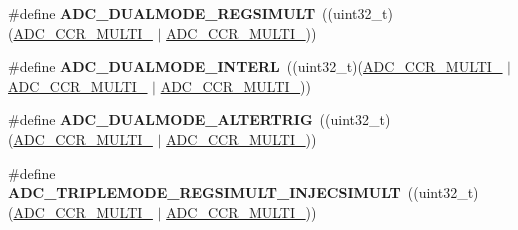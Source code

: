 \begin{DoxyCompactItemize}
\mbox{\label{group___a_d_c_ex___common__mode_ga5318d363b48a4244335cdafaed0d179c}} 
\#define {\bfseries A\+D\+C\+\_\+\+D\+U\+A\+L\+M\+O\+D\+E\+\_\+\+R\+E\+G\+S\+I\+M\+U\+LT}~((uint32\+\_\+t)(\mbox{\hyperlink{group___peripheral___registers___bits___definition_gae6a5be6cff1227431b8d54dffcc1ce88}{A\+D\+C\+\_\+\+C\+C\+R\+\_\+\+M\+U\+L\+T\+I\+\_}} $\vert$ \mbox{\hyperlink{group___peripheral___registers___bits___definition_ga8781dec7f076b475b85f8470aee94d06}{A\+D\+C\+\_\+\+C\+C\+R\+\_\+\+M\+U\+L\+T\+I\+\_}}))
\item 
\mbox{\label{group___a_d_c_ex___common__mode_ga29697d148e4ed75c3d2adaef0f3e1385}} 
\#define {\bfseries A\+D\+C\+\_\+\+D\+U\+A\+L\+M\+O\+D\+E\+\_\+\+I\+N\+T\+E\+RL}~((uint32\+\_\+t)(\mbox{\hyperlink{group___peripheral___registers___bits___definition_gae6a5be6cff1227431b8d54dffcc1ce88}{A\+D\+C\+\_\+\+C\+C\+R\+\_\+\+M\+U\+L\+T\+I\+\_}} $\vert$ \mbox{\hyperlink{group___peripheral___registers___bits___definition_ga8781dec7f076b475b85f8470aee94d06}{A\+D\+C\+\_\+\+C\+C\+R\+\_\+\+M\+U\+L\+T\+I\+\_}} $\vert$ \mbox{\hyperlink{group___peripheral___registers___bits___definition_gae4e7104ce01e3a79b8f6138d87dc3684}{A\+D\+C\+\_\+\+C\+C\+R\+\_\+\+M\+U\+L\+T\+I\+\_}}))
\item 
\mbox{\label{group___a_d_c_ex___common__mode_ga45e63dd5e2f36e62fa1b2cb9eff891ed}} 
\#define {\bfseries A\+D\+C\+\_\+\+D\+U\+A\+L\+M\+O\+D\+E\+\_\+\+A\+L\+T\+E\+R\+T\+R\+IG}~((uint32\+\_\+t)(\mbox{\hyperlink{group___peripheral___registers___bits___definition_gae55be7b911b4c0272543f98a0dba5f20}{A\+D\+C\+\_\+\+C\+C\+R\+\_\+\+M\+U\+L\+T\+I\+\_}} $\vert$ \mbox{\hyperlink{group___peripheral___registers___bits___definition_gae4e7104ce01e3a79b8f6138d87dc3684}{A\+D\+C\+\_\+\+C\+C\+R\+\_\+\+M\+U\+L\+T\+I\+\_}}))
\item 
\mbox{\label{group___a_d_c_ex___common__mode_gaf035650c27a3a4655c2ee42e96a277dd}} 
\#define {\bfseries A\+D\+C\+\_\+\+T\+R\+I\+P\+L\+E\+M\+O\+D\+E\+\_\+\+R\+E\+G\+S\+I\+M\+U\+L\+T\+\_\+\+I\+N\+J\+E\+C\+S\+I\+M\+U\+LT}~((uint32\+\_\+t)(\mbox{\hyperlink{group___peripheral___registers___bits___definition_ga5087b3cb0d4570b80b3138c277bcbf6c}{A\+D\+C\+\_\+\+C\+C\+R\+\_\+\+M\+U\+L\+T\+I\+\_}} $\vert$ \mbox{\hyperlink{group___peripheral___registers___bits___definition_gae4e7104ce01e3a79b8f6138d87dc3684}{A\+D\+C\+\_\+\+C\+C\+R\+\_\+\+M\+U\+L\+T\+I\+\_}}))

\end{DoxyCompactItemize}
